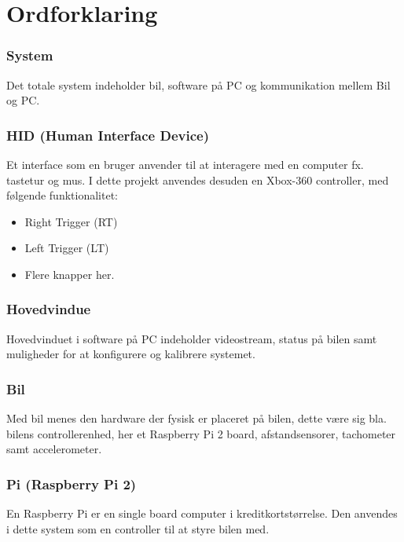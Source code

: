 
\section{Ordforklaring}

\subsubsection{System}
Det totale system indeholder bil, software på PC og kommunikation mellem Bil og PC.

\subsubsection{HID (Human Interface Device)}
Et interface som en bruger anvender til at interagere med en computer fx. tastetur og mus. I dette projekt anvendes desuden en Xbox-360 controller, med følgende funktionalitet: 

\begin{itemize}
	\item Right Trigger (RT)
	\item Left Trigger (LT)
	\item Flere knapper her.
\end{itemize}


\subsubsection{Hovedvindue}
Hovedvinduet i software på PC indeholder videostream, status på bilen samt muligheder for at konfigurere og kalibrere systemet.

\subsubsection{Bil}
Med bil menes den hardware der fysisk er placeret på bilen, dette være sig bla. bilens controllerenhed, her et Raspberry Pi 2 board, afstandsensorer, tachometer samt accelerometer.

\subsubsection{Pi (Raspberry Pi 2)}
En Raspberry Pi er en single board computer i kreditkortstørrelse. Den anvendes i dette system som en controller til at styre bilen med.

